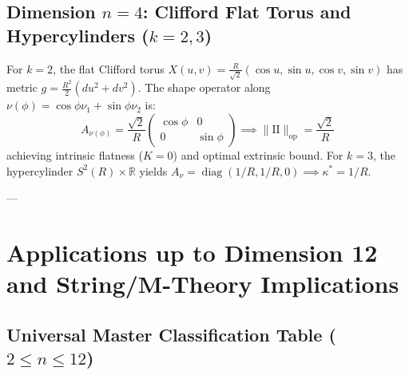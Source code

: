 \documentclass[11pt,reqno]{amsart}
\theoremstyle{definition}
\providecommand{\R}{\mathbb{R}}
\providecommand{\II}{\mathrm{I\!I}}
\newcommand{\op}{\mathrm{op}}
\numberwithin{equation}{section}
\providecommand{\II}{\mathrm{II}}
\providecommand{\R}{\mathbb{R}}
\begin{document}
\subsection{Dimension \texorpdfstring{$n=4$}{n=4}: Clifford Flat Torus and Hypercylinders \texorpdfstring{($k=2, 3$)}{(k=2, 3)}}
For $k=2$, the flat Clifford torus $X(u, v) = \frac{R}{\sqrt{2}} (\cos u, \sin u, \cos v, \sin v)$ has metric $g = \frac{R^2}{2}(du^2 + dv^2)$. The shape operator along $\nu(\phi) = \cos\phi \nu_1 + \sin\phi \nu_2$ is:
\begin{equation}
A_{\nu(\phi)} = \frac{\sqrt{2}}{R} \begin{pmatrix} \cos\phi & 0 \\ 0 & \sin\phi \end{pmatrix} \implies \|\II\|_{\op} = \frac{\sqrt{2}}{R}
\end{equation}
achieving intrinsic flatness ($K = 0$) and optimal extrinsic bound. For $k=3$, the hypercylinder $S^2(R) \times \R$ yields $A_\nu = \operatorname{diag}(1/R, 1/R, 0) \implies \kappa^* = 1/R$.

---

\section{Applications up to Dimension 12 and String/M-Theory Implications}

\subsection{Universal Master Classification Table \texorpdfstring{($2 \le n \le 12$)}{(2 <= n <= 12)}}
\end{document}
